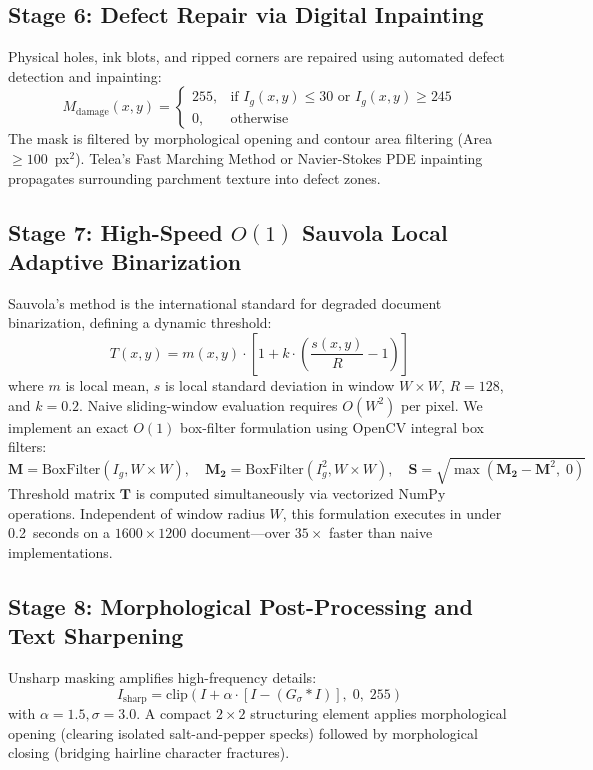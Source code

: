 \documentclass[11pt, a4paper]{article}
\begin{document}
\subsection{Stage 6: Defect Repair via Digital Inpainting}
Physical holes, ink blots, and ripped corners are repaired using automated defect detection and inpainting:
\begin{equation}
M_{\text{damage}}(x, y) = \begin{cases} 255, & \text{if } I_g(x, y) \le 30 \text{ or } I_g(x, y) \ge 245 \\ 0, & \text{otherwise} \end{cases}
\end{equation}
The mask is filtered by morphological opening and contour area filtering (Area $\ge 100$~px$^2$). Telea's Fast Marching Method \cite{telea2004} or Navier-Stokes PDE inpainting \cite{bertalmio2001} propagates surrounding parchment texture into defect zones.

\subsection{Stage 7: High-Speed $O(1)$ Sauvola Local Adaptive Binarization}
Sauvola's method \cite{sauvola2000} is the international standard for degraded document binarization, defining a dynamic threshold:
\begin{equation}
T(x, y) = m(x, y) \cdot \left[ 1 + k \cdot \left( \frac{s(x, y)}{R} - 1 \right) \right]
\label{eq:sauvola}
\end{equation}
where $m$ is local mean, $s$ is local standard deviation in window $W \times W$, $R = 128$, and $k = 0.2$. Naive sliding-window evaluation requires $O(W^2)$ per pixel. We implement an exact $O(1)$ box-filter formulation using OpenCV integral box filters:
\begin{equation}
\mathbf{M} = \text{BoxFilter}(I_g, W \times W), \quad \mathbf{M_2} = \text{BoxFilter}(I_g^2, W \times W), \quad \mathbf{S} = \sqrt{\max(\mathbf{M_2} - \mathbf{M}^2, \; 0)}
\end{equation}
Threshold matrix $\mathbf{T}$ is computed simultaneously via vectorized NumPy operations. Independent of window radius $W$, this formulation executes in under 0.2~seconds on a $1600 \times 1200$ document---over $35\times$ faster than naive implementations.

\subsection{Stage 8: Morphological Post-Processing and Text Sharpening}
Unsharp masking amplifies high-frequency details:
\begin{equation}
I_{\text{sharp}} = \text{clip}\left( I + \alpha \cdot [I - (G_\sigma * I)], \; 0, \; 255 \right)
\end{equation}
with $\alpha = 1.5, \sigma = 3.0$. A compact $2 \times 2$ structuring element applies morphological opening (clearing isolated salt-and-pepper specks) followed by morphological closing (bridging hairline character fractures).
\end{document}
